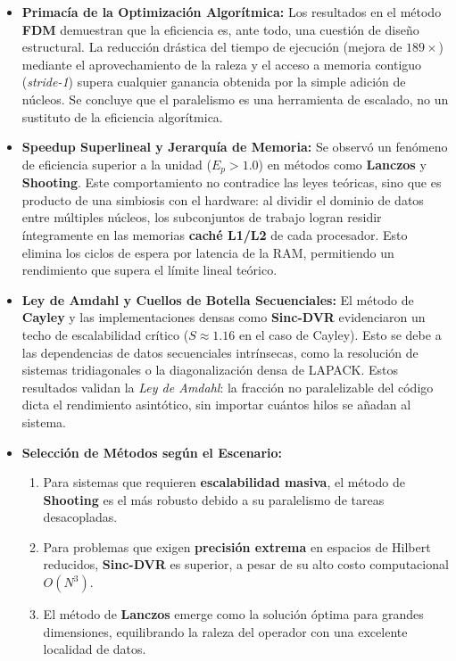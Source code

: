 \documentclass[11pt,fleqn]{article}
\begin{document}
\begin{itemize}
    \item \textbf{Primacía de la Optimización Algorítmica:} Los resultados en el método \textbf{FDM} demuestran que la eficiencia es, ante todo, una cuestión de diseño estructural. La reducción drástica del tiempo de ejecución (mejora de $189\times$) mediante el aprovechamiento de la raleza y el acceso a memoria contiguo (\textit{stride-1}) supera cualquier ganancia obtenida por la simple adición de núcleos. Se concluye que el paralelismo es una herramienta de escalado, no un sustituto de la eficiencia algorítmica.

    \item \textbf{Speedup Superlineal y Jerarquía de Memoria:} Se observó un fenómeno de eficiencia superior a la unidad ($E_p > 1.0$) en métodos como \textbf{Lanczos} y \textbf{Shooting}. Este comportamiento no contradice las leyes teóricas, sino que es producto de una simbiosis con el hardware: al dividir el dominio de datos entre múltiples núcleos, los subconjuntos de trabajo logran residir íntegramente en las memorias \textbf{caché L1/L2} de cada procesador. Esto elimina los ciclos de espera por latencia de la RAM, permitiendo un rendimiento que supera el límite lineal teórico.

    \item \textbf{Ley de Amdahl y Cuellos de Botella Secuenciales:} El método de \textbf{Cayley} y las implementaciones densas como \textbf{Sinc-DVR} evidenciaron un techo de escalabilidad crítico ($S \approx 1.16$ en el caso de Cayley). Esto se debe a las dependencias de datos secuenciales intrínsecas, como la resolución de sistemas tridiagonales o la diagonalización densa de LAPACK. Estos resultados validan la \textit{Ley de Amdahl}: la fracción no paralelizable del código dicta el rendimiento asintótico, sin importar cuántos hilos se añadan al sistema.

    \item \textbf{Selección de Métodos según el Escenario:} 
    \begin{enumerate}
        \item Para sistemas que requieren \textbf{escalabilidad masiva}, el método de \textbf{Shooting} es el más robusto debido a su paralelismo de tareas desacopladas.
        \item Para problemas que exigen \textbf{precisión extrema} en espacios de Hilbert reducidos, \textbf{Sinc-DVR} es superior, a pesar de su alto costo computacional $O(N^3)$.
        \item El método de \textbf{Lanczos} emerge como la solución óptima para grandes dimensiones, equilibrando la raleza del operador con una excelente localidad de datos.
    \end{enumerate}
\end{itemize}
\end{document}
